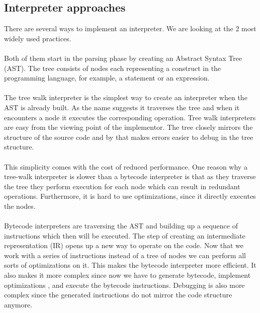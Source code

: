 \documentclass{article}
\begin{document}
\subsection{Interpreter approaches}
There are several ways to implement an interpreter. We are looking
at the 2 most widely used practices. 
\\\\
Both of them start in the parsing phase by creating an Abstract Syntax
Tree (AST). The tree consists of nodes each representing a construct in
the programming language, for example, a statement or an expression. 
\\\\
The tree walk interpreter is the simplest way to create an interpreter when the
AST is already built. As the name suggests it traverses the tree and when it
encounters a node it executes the corresponding operation. Tree walk
interpreters are easy from the viewing point of the implementor. The tree
closely mirrors the structure of the source code and by that makes errors
easier to debug in the tree structure. ~\cite{bebic}
\\\\
This simplicity comes with the cost of reduced performance. One reason why a
tree-walk interpreter is slower than a bytecode interpreter is that as they
traverse the tree they perform execution for each node which can result in
redundant operations. Furthermore, it is hard to use optimizations, since
it directly executes the nodes. ~\cite{bebic}
\\\\
Bytecode interpreters are traversing the AST and building up a sequence of
instructions which then will be executed. The step of creating an intermediate
representation (IR) opens up a new way to operate on the code. Now that we work
with a series of instructions instead of a tree of nodes we can perform all
sorts of optimizations on it. This makes the bytecode interpreter more
efficient. It also makes it more complex since now we have to generate
bytecode, implement optimizations , and execute the bytecode instructions.
Debugging is also more complex since the generated instructions do not mirror
the code structure anymore. ~\cite{bebic}
\end{document}
